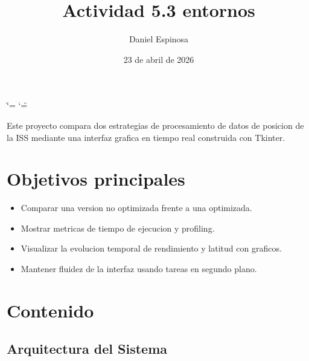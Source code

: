 \documentclass[letterpaper,10pt,spanish]{sphinxmanual}
\title{Actividad 5.3 entornos}
\date{23 de abril de 2026}
\author{Daniel Espinosa}
\begin{document}
\ifdefined\shorthandoff
  \ifnum\catcode`\=\string=\active\shorthandoff{=}\fi
  \ifnum\catcode`\"=\active{}\fi
\fi

\pagestyle{empty}
\sphinxmaketitle
\pagestyle{plain}
\sphinxtableofcontents
\pagestyle{normal}
\label{\detokenize{index::doc}}


\sphinxAtStartPar
Este proyecto compara dos estrategias de procesamiento de datos de posicion de la ISS
mediante una interfaz grafica en tiempo real construida con Tkinter.


\chapter{Objetivos principales}
\label{\detokenize{index:objetivos-principales}}\begin{itemize}
\item {} 
\sphinxAtStartPar
Comparar una version no optimizada frente a una optimizada.

\item {} 
\sphinxAtStartPar
Mostrar metricas de tiempo de ejecucion y profiling.

\item {} 
\sphinxAtStartPar
Visualizar la evolucion temporal de rendimiento y latitud con graficos.

\item {} 
\sphinxAtStartPar
Mantener fluidez de la interfaz usando tareas en segundo plano.

\end{itemize}


\chapter{Contenido}
\label{\detokenize{index:contenido}}
\sphinxstepscope


\section{Arquitectura del Sistema}
\label{\detokenize{arquitectura:arquitectura-del-sistema}}\label{\detokenize{arquitectura::doc}}
\end{document}
